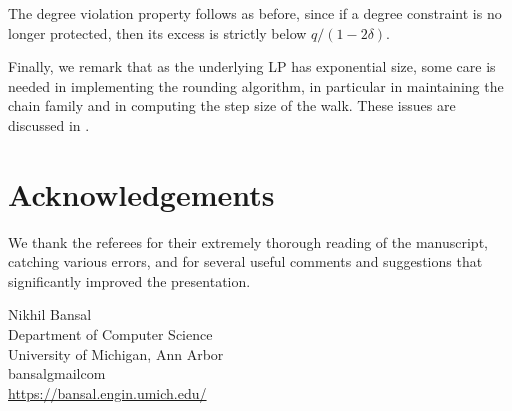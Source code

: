 \documentclass{toc}
\begin{document}
The degree violation property follows as before, since if a degree constraint is no longer protected, then its excess is strictly below $q/(1-2\delta)$. 
%
%

Finally, we remark that as the underlying LP has exponential size, some care is needed in implementing the rounding algorithm, in particular in maintaining the chain family and in computing the step size of the walk. These issues are discussed in \cite{BN16}.



%
%
%
%

%
%
%
%
%
%
%
%
%
%
%
%
%
%
%
%
%

%
%
%
%
%
%

%
%
%
%
%
%
%
%


%
%
%

%
%
%
%

%
%
%
%
%
%
%
%
%
%

%
%
%
%
%

%

%
%
%
%
%
%
%

%
%
%
%
%
%

%
%
%
%
%
%
%
%
%
%

%
%
%
%
%
%

%
%
%
%
%
%
%
%

%
%
%
%
%



\section*{Acknowledgements}
We thank the referees for their extremely thorough reading of the manuscript, catching various errors, and for several useful comments and suggestions that significantly improved the presentation.


%
%
%
%


%
%
%
%
%
\begin{tocauthors}
\begin{tocinfo}[bansal]
 Nikhil Bansal\\
 Department of Computer Science\\
 University of Michigan, Ann Arbor\\
  bansal\tocat{}gmail\tocdot{}com \\
  \url{https://bansal.engin.umich.edu/}
\end{tocinfo}
\end{tocauthors}
\end{document}
